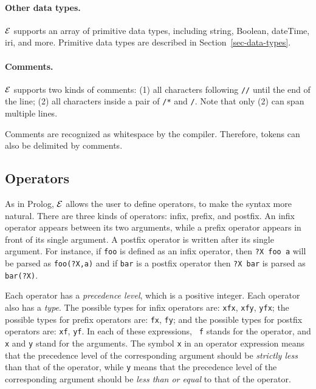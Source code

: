 \documentclass[11pt]{article}
\newcommand{\ERGO}{\mbox{\ensuremath{\cal{E}}\smaller{{\sc{RGO}}}}\xspace}
\newcommand{\FLSYSTEM}{\ERGO}
\begin{document}
\paragraph{Other data types.}
\FLSYSTEM supports an array of primitive data types, including string, Boolean,
dateTime, iri, and more. Primitive data types are described in
Section~\ref{sec-data-types}.

\paragraph{Comments.}

%
\FLSYSTEM supports two kinds of comments: (1) all characters following
{\tt //} until the end of the line; (2) all characters inside a pair of
{\tt /*} and {\tt */}. Note that only (2) can span multiple lines.

Comments are recognized as whitespace by the compiler.  Therefore,
tokens can also be delimited by comments.


\subsection{Operators}


As in Prolog, \FLSYSTEM allows the user to define operators, to make the
syntax more natural.
There are three kinds of operators: infix,
prefix, and postfix. An infix operator appears between its two arguments,
while a prefix operator appears in front of its single argument. A postfix
operator is written
after its single argument. For instance, if {\tt foo} is defined as an
infix operator, then {\tt ?X foo a} will be parsed as {\tt foo(?X,a)} and if
{\tt bar} is a postfix operator then {\tt ?X bar} is parsed as {\tt bar(?X)}. 

%
Each operator has a \emph{precedence level}, which is a positive integer.
Each operator also has a \emph{type}. The possible types for infix operators
are: {\tt xfx}, {\tt xfy}, {\tt yfx}; the possible types for prefix
operators are: {\tt fx}, {\tt fy}; and the possible types for postfix
operators are: {\tt xf}, {\tt yf}. In each of these expressions, {\tt
  f} stands for the operator, and {\tt x} and {\tt y} stand for the
arguments.  The symbol {\tt x} in an operator expression means that the
precedence level of the corresponding argument should be \emph{strictly
  less} than that of the operator, while {\tt y} means that the precedence
level of the corresponding argument should be \emph{less than or equal} to
that of the operator.
\end{document}
